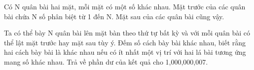 Có N quân bài hai mặt, mỗi mặt có một số khác nhau. Mặt trước của các quân bài chứa N số phân biệt từ 1 đến N. Mặt sau của các quân bài cũng vậy.  

   Ta có thể bày N quân bài lên mặt bàn theo thứ tự bất kỳ và với mỗi quân bài có thể lật mặt trước hay mặt sau tùy ý. Đếm số cách bày bài khác nhau, biết rằng hai cách bày bài là khác nhau nếu có ít nhất một vị trí với hai lá bài tương ứng mang số khác nhau. Trả về phần dư của kết quả cho 1,000,000,007.